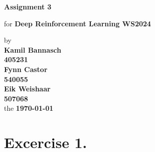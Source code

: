 \documentclass[12pt, a4paper,DIV=12, bibliography=totocnumbered]{scrartcl}
\newcommand{\ASSNR}{3}
\newcommand{\AuthorONE}{Kamil Bannasch}
\newcommand{\MatNoONE}{405231}
\newcommand{\AuthorTWO}{Fynn Castor}
\newcommand{\MatNoTWO}{540055}
\newcommand{\AuthorTHREE}{Eik Weishaar}
\newcommand{\MatNoTHREE}{507068}
\begin{document}
\begin{titlepage}
   \begin{center}
       \vspace*{5cm}

       \textbf{\Huge{Assignment \ASSNR}}

       \vspace{0.5cm}
        for {\large\textbf{Deep Reinforcement Learning WS2024}}
        \vspace{0.75cm}

       by \\
        \textbf{\AuthorONE}\\
        \vspace{0.125cm}
       	\textbf{\MatNoONE}\\ 
       	\vspace{0.25cm}
        \textbf{\AuthorTWO}\\
        \vspace{0.125cm}
       	\textbf{\MatNoTWO}\\ 
       	\vspace{0.25cm}
        \textbf{\AuthorTHREE}\\
        \vspace{0.125cm}
        \textbf{\MatNoTHREE}\\ 
        \vspace{0.25cm}
       the \textbf{\today}

       \vfill
    
    
            
   \end{center}
\end{titlepage}

\section{Excercise 1.}
\end{document}
